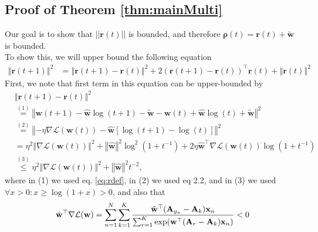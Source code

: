 \documentclass[twoside,11pt,english]{article}
\newcommand{\sumk}{\sum_{k=1}^{K}}
\newcommand{\sumr}{\sum_{r=1}^{K}}
\newcommand{\vect}[1]{\mathbf{#1}}
\newcommand{\bm}[1]{\ensuremath{\boldsymbol{#1}}}
\begin{document}
\subsection{Proof of Theorem \ref{thm:mainMulti}}
Our goal is to show that $||\vect{r}(t)||$ is bounded, and therefore $\bm{\rho}(t) = \vect{r}(t)+\tilde{\vect{w}}$ is bounded.\\
To show this, we will upper bound the following equation
\begin{align} \label{eq: r(t+1) norm, CE}
\left\Vert \mathbf{r}\left(t+1\right)\right\Vert ^{2} & =\left\Vert \mathbf{r}\left(t+1\right)-\mathbf{r}\left(t\right)\right\Vert ^{2}+2\left(\mathbf{r}\left(t+1\right)-\mathbf{r}\left(t\right)\right)^{\top}\mathbf{r}\left(t\right)+\left\Vert \mathbf{r}\left(t\right)\right\Vert ^{2}
\end{align}
First, we note that first term in this equation can be upper-bounded
by 
\begin{align} \label{eq: square r difference, CE case}
& \left\Vert \mathbf{r}\left(t+1\right)-\mathbf{r}\left(t\right)\right\Vert ^{2}\nonumber \\
& \overset{\left(1\right)}{=}\left\Vert \mathbf{w}\left(t+1\right)-\hat{\mathbf{w}}\log\left(t+1\right)-\tilde{\mathbf{w}}-\mathbf{w}\left(t\right)+\hat{\mathbf{w}}\log\left(t\right)+\tilde{\mathbf{w}}\right\Vert ^{2}\nonumber \\
& \overset{\left(2\right)}{=}\left\Vert -\eta\nabla\mathcal{L}\left(\mathbf{w}\left(t\right)\right)-\hat{\mathbf{w}}\left[\log\left(t+1\right)-\log\left(t\right)\right]\right\Vert ^{2}\nonumber \\
& =\eta^{2}\left\Vert \nabla\mathcal{L}\left(\mathbf{w}\left(t\right)\right)\right\Vert ^{2}+\left\Vert \hat{\mathbf{w}}\right\Vert ^{2}\log^{2}\left(1+t^{-1}\right)+2\eta\hat{\mathbf{w}}^{\top}\nabla\mathcal{L}\left(\mathbf{w}\left(t\right)\right)\log\left(1+t^{-1}\right)\nonumber \\
& \overset{\left(3\right)}{\leq}\eta^{2}\left\Vert \nabla\mathcal{L}\left(\mathbf{w}\left(t\right)\right)\right\Vert ^{2}+\left\Vert \hat{\mathbf{w}}\right\Vert ^{2}t^{-2},
\end{align}
where in (1) we used eq. \ref{eq:rdef}, in (2) we used eq 2.2, and in (3) we used $\forall x>0: x\ge \log(1+x)>0$, and also that
\begin{equation}
\hat{\vect{w}}^\top \nabla \mathcal{L}(\vect{w})=\sumn \sumk \frac{\hat{\vect{w}}^\top(\vect{A}_{y_n}-\vect{A}_k)\vect{x}_n}{\sumr \e(\vect{w}^\top(\vect{A}_r-\vect{A}_k)\vect{x}_n)}<0
\end{equation}
\end{document}
